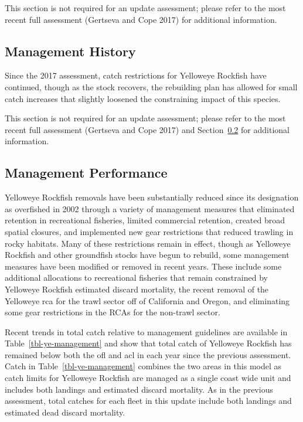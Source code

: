 \documentclass[
  english,
]{article}
\begin{document}
This section is not required for an update assessment; please refer to
the most recent full assessment (Gertseva and Cope 2017) for additional
information.

\subsection{Management History}\label{management-history}

Since the 2017 assessment, catch restrictions for Yelloweye Rockfish
have continued, though as the stock recovers, the rebuilding plan has
allowed for small catch increases that slightly loosened the
constraining impact of this species.

This section is not required for an update assessment; please refer to
the most recent full assessment (Gertseva and Cope 2017) and
Section~\ref{sec-mgmt} for additional information.

\subsection{Management Performance}\label{sec-mgmt}

Yelloweye Rockfish removals have been substantially reduced since its
designation as overfished in 2002 through a variety of management
measures that eliminated retention in recreational fisheries, limited
commercial retention, created broad spatial closures, and implemented
new gear restrictions that reduced trawling in rocky habitats. Many of
these restrictions remain in effect, though as Yelloweye Rockfish and
other groundfish stocks have begun to rebuild, some management measures
have been modified or removed in recent years. These include some
additional allocations to recreational fisheries that remain constrained
by Yelloweye Rockfish estimated discard mortality, the recent removal of
the Yelloweye \gls{rca} for the trawl sector off of California and
Oregon, and eliminating some gear restrictions in the RCAs for the
non-trawl sector.

Recent trends in total catch relative to management guidelines are
available in Table~\ref{tbl-ye-management} and show that total catch of
Yelloweye Rockfish has remained below both the \gls{ofl} and \gls{acl}
in each year since the previous assessment. Catch in
Table~\ref{tbl-ye-management} combines the two areas in this model as
catch limits for Yelloweye Rockfish are managed as a single coast wide
unit and includes both landings and estimated discard mortality. As in
the previous assessment, total catches for each fleet in this update
include both landings and estimated dead discard mortality.
\end{document}

